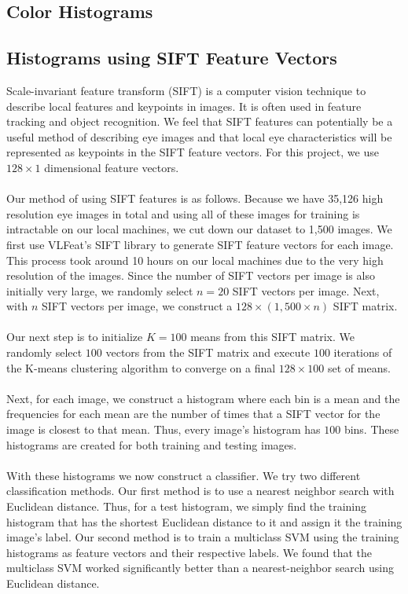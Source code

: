 \documentclass{article} %
\begin{document}
\subsection{Color Histograms}

\subsection{Histograms using SIFT Feature Vectors}

Scale-invariant feature transform (SIFT) is a computer vision technique to describe local features and keypoints in images. It is often used in feature tracking and object recognition. We feel that SIFT features can potentially be a useful method of describing eye images and that local eye characteristics will be represented as keypoints in the SIFT feature vectors. For this project, we use $128 \times 1$ dimensional feature vectors.\\ \\
Our method of using SIFT features is as follows. Because we have 35,126 high resolution eye images in total and using all of these images for training is intractable on our local machines, we cut down our dataset to 1,500 images. We first use VLFeat's SIFT library to generate SIFT feature vectors for each image. This process took around 10 hours on our local machines due to the very high resolution of the images. Since the number of SIFT vectors per image is also initially very large, we randomly select $n=20$ SIFT vectors per image. Next, with $n$ SIFT vectors per image, we construct a $128 \times (1,500 \times n)$ SIFT matrix. \\ \\
Our next step is to initialize $K=100$ means from this SIFT matrix. We randomly select $100$ vectors from the SIFT matrix and execute $100$ iterations of the K-means clustering algorithm to converge on a final $128 \times 100$ set of means. \\ \\
Next, for each image, we construct a histogram where each bin is a mean and the frequencies for each mean are the number of times that a SIFT vector for the image is closest to that mean. Thus, every image's histogram has $100$ bins. These histograms are created for both training and testing images.\\ \\
With these histograms we now construct a classifier. We try two different classification methods. Our first method is to use a nearest neighbor search with Euclidean distance. Thus, for a test histogram, we simply find the training histogram that has the shortest Euclidean distance to it and assign it the training image's label. Our second method is to train a multiclass SVM using the training histograms as feature vectors and their respective labels. We found that the multiclass SVM worked significantly better than a nearest-neighbor search using Euclidean distance. \\ \\
\end{document}
